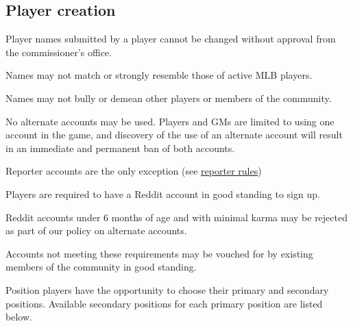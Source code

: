 \subsection{Player creation}
\begin{deepEnumerate}
	\item Player names submitted by a player cannot be changed
	without approval from the commissioner’s office.
	\begin{deepEnumerate}
		\item Names may not match or strongly resemble those of active MLB players.
		\item Names may not bully or demean other players or members of the community.
		\item No alternate accounts may be used.
		Players and GMs are limited to using one account in the game,
		and discovery of the use of an alternate account
		will result in an immediate and permanent ban of both accounts.
		\begin{deepEnumerate}
			\item Reporter accounts are the only exception (see \hyperref[sec:reporters]{reporter rules})
		\end{deepEnumerate}
	\end{deepEnumerate}
	\item Players are required to have a Reddit account in good standing to sign up.
	\begin{deepEnumerate}
		\item Reddit accounts under 6 months of age and with minimal karma
		may be rejected as part of our policy on alternate accounts.
		\begin{deepEnumerate}
			\item Accounts not meeting these requirements may be vouched for
			by existing members of the community in good standing.
		\end{deepEnumerate}
	\end{deepEnumerate}
	\item Position players have the opportunity to choose their primary and secondary positions.
	Available secondary positions for each primary position are listed below.
	

\end{deepEnumerate}
